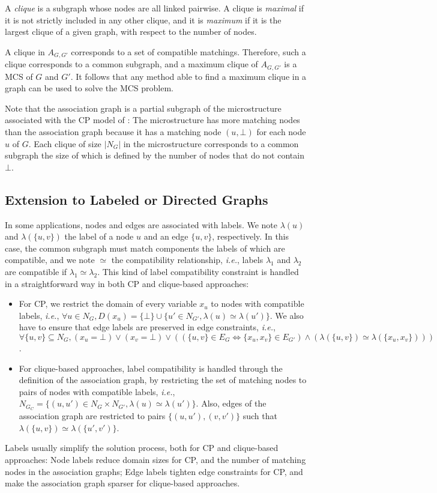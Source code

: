 \documentclass{llncs}
\begin{document}
A \emph{clique} is a subgraph whose nodes are all linked pairwise.
A clique is \emph{maximal} if it is not strictly included in any other clique, and it is \emph{maximum} if it is the largest clique of a given graph, with respect to the number of nodes.

A clique in $A_{G,G'}$ corresponds to a set of compatible matchings. Therefore, such a clique corresponds to a common subgraph, and a maximum clique of $A_{G,G'}$ is a MCS of $G$ and $G'$.
It follows that any method able to find a maximum clique in a graph can be used to solve the MCS problem. 

Note that the association graph is a partial subgraph of the microstructure \cite{DBLP:conf/aaai/Jegou93a} associated with the CP model of  \cite{DBLP:conf/mco/VismaraV08}: The microstructure has more matching nodes than the association graph because it has a matching node $(u,\bot)$ for each node $u$ of $G$. Each clique of size $|N_G|$ in the microstructure corresponds to a common subgraph the size of which is defined by the number of nodes that do not contain $\bot$.


\subsection{Extension to Labeled or Directed Graphs}\label{extension}

In some applications, nodes and edges are associated with labels. We note $\lambda(u)$ and $\lambda(\{u,v\})$ the label of a node $u$ and an edge $\{u,v\}$, respectively. In this case, the common  subgraph must match components the labels of which are compatible, and we note $\simeq$ the compatibility relationship, {\em i.e.}, labels $\lambda_1$ and $\lambda_2$ are compatible if $\lambda_1\simeq\lambda_2$. This kind of label compatibility constraint is handled in a straightforward way in both CP and clique-based approaches:
\begin{itemize}
\item For CP, we restrict the domain of every variable $x_u$ to nodes with compatible labels, {\em i.e.}, $\forall u\in N_G, D(x_u) = \{\bot\}\cup \{u'\in N_{G'}, \lambda(u)\simeq\lambda(u')\}$. We also have to ensure that edge labels are preserved in edge constraints, {\em i.e.}, $\forall \{u,v\}\subseteq N_G, (x_u=\bot)\vee (x_v=\bot) \vee ((\{u,v\}\in E_G\Leftrightarrow \{x_u,x_v\}\in E_{G'}) \wedge (\lambda(\{u,v\}) \simeq \lambda(\{x_u,x_v\})))$.

\item For clique-based approaches, label compatibility is handled through the definition of the association graph, by restricting the set of matching nodes to pairs of nodes with compatible labels, {\em i.e.}, $N_{G_C} = \{(u,u')\in N_G\times N_{G'}, \lambda(u)\simeq\lambda(u')\}$. Also, edges of the association graph are restricted to pairs $\{(u,u'),(v,v')\}$ such that $\lambda(\{u,v\}) \simeq \lambda(\{u',v')\}$.
\end{itemize} 
Labels usually simplify the solution process, both for CP and clique-based approaches: Node labels reduce domain sizes for CP, and the number of matching nodes in the association graphs; Edge labels tighten edge constraints for CP, and make the association graph sparser for clique-based approaches. 
\end{document}
